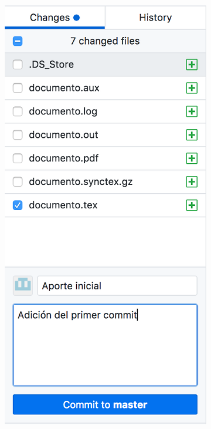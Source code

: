 \documentclass[10pt]{article}
\begin{document}
\begin{figure}[!h]
    \centering
    \begin{subfigure}[b]{0.3\textwidth}
        \includegraphics[width=\textwidth]{Figuras/cambios1.png}

\end{subfigure}
\end{figure}
\end{document}

